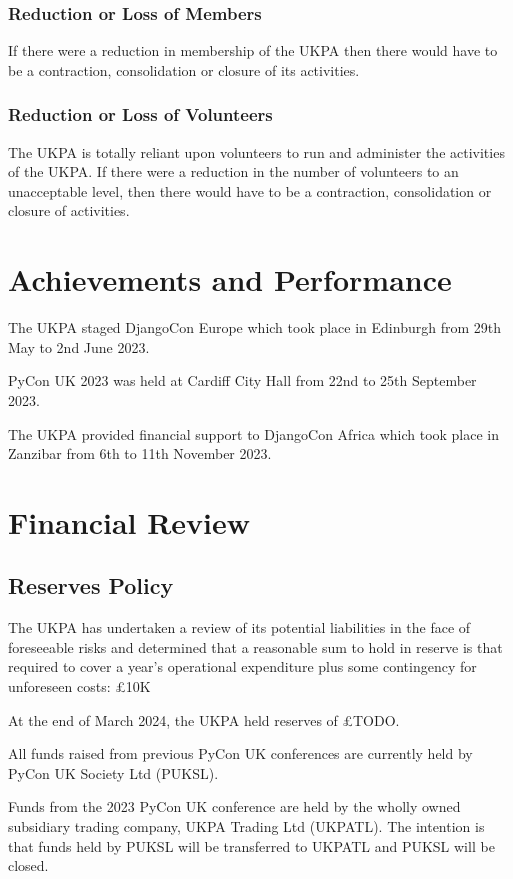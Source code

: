\documentclass[11pt, final]{article}
\begin{document}
\subsubsection{Reduction or Loss of Members}
If there were a reduction in membership of the UKPA then there would have to be a contraction, consolidation or closure of its activities.


\subsubsection{Reduction or Loss of Volunteers}
The UKPA is totally reliant upon volunteers to run and administer the activities of the UKPA. If there were a reduction in the number of volunteers to an unacceptable level, then there would have to be a contraction, consolidation or closure of activities.

\section{Achievements and Performance}
The UKPA staged DjangoCon Europe which took place in Edinburgh from 29th May to 2nd June 2023.

PyCon UK 2023 was held at Cardiff City Hall from 22nd to 25th September 2023.

The UKPA provided financial support to DjangoCon Africa which took place in Zanzibar from 6th to 11th November 2023.

\section{Financial Review}

\subsection{Reserves Policy}
The UKPA has undertaken a review of its potential liabilities in the face of foreseeable risks and determined that a reasonable sum to hold in reserve is that required to cover a year's operational expenditure plus some contingency for unforeseen costs: \pounds10K

At the end of March 2024, the UKPA held reserves of \pounds TODO.

All funds raised from previous PyCon UK conferences are currently held by PyCon UK Society Ltd (PUKSL). 

Funds from the 2023 PyCon UK conference are held by the wholly owned subsidiary trading company, UKPA Trading Ltd (UKPATL). The intention is that funds held by PUKSL will be transferred to UKPATL and PUKSL will be closed.
\end{document}
